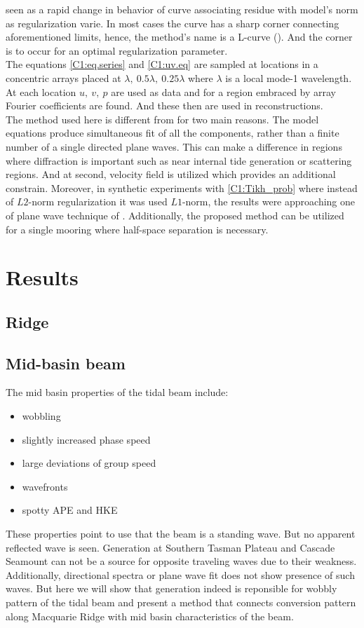 \documentclass[12pt]{article}
\begin{document}
seen as a rapid change in behavior of curve associating residue with model's norm as regularization 
varie. In most cases the curve has a sharp corner connecting aforementioned limits, hence, the 
method's name is a L-curve (\cite{hansen1999curve}). And the corner is to occur for an optimal 
regularization parameter.\\
The equations \eqref{C1:eq.series} and \eqref{C1:uv.eq} are sampled at locations in a concentric 
arrays placed at $\lambda,~0.5\lambda,~0.25\lambda$ where $\lambda$ is a local mode-1 wavelength. 
At each location $u,~v,~p$ are used as data and for a region embraced by array Fourier coefficients 
are found. And these then are used in reconstructions.\\
The method used here is different from \citep{zhao2010long} for two main reasons. The model 
equations produce simultaneous fit of all the components, rather than a finite number of a single 
directed plane waves. This can make a difference in regions where diffraction is important such as 
near internal tide generation or scattering regions. And at second, velocity field is utilized 
which provides an additional constrain. Moreover, in synthetic experiments with 
\eqref{C1:Tikh_prob} where instead of $L2$-norm regularization it was used $L1$-norm, the results 
were approaching one of plane wave technique of \citep{zhao2010long}. Additionally, the proposed 
method can be utilized for a single mooring where half-space separation is necessary.

\section{Results}
\subsection{Ridge}
\subsection{Mid-basin beam}
The mid basin properties of the tidal beam include:
\begin{itemize}
	\item wobbling
	\item slightly increased phase speed
	\item large deviations of group speed
	\item wavefronts
	\item spotty APE and HKE
\end{itemize}
\begin{figure}
\end{figure}
These properties point to use that the beam is a standing wave. But no apparent reflected wave is 
seen. Generation at Southern Tasman Plateau and Cascade Seamount can not be a source for opposite 
traveling waves due to their weakness. Additionally, directional spectra or plane wave fit does not 
show presence of such waves. But here we will show that generation indeed is reponsible for wobbly 
pattern of the tidal beam and present a method that connects conversion pattern along Macquarie 
Ridge with mid basin characteristics of the beam.
\end{document}
